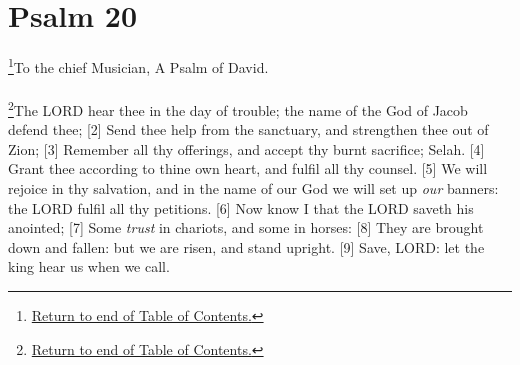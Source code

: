 \chapter{Psalm 20}
\footnote{\textcolor[rgb]{0.00,0.25,0.00}{\hyperlink{TOC}{Return to end of Table of Contents.}}}\textcolor[rgb]{0.00,0.00,1.00}{To the chief Musician, A Psalm of David.}\\
\\
\footnote{\textcolor[cmyk]{0.99998,1,0,0}{\hyperlink{TOC}{Return to end of Table of Contents.}}}\textcolor[cmyk]{0.99998,1,0,0}{The LORD hear thee in the day of trouble; the name of the God of Jacob defend thee;}
[2] \textcolor[cmyk]{0.99998,1,0,0}{Send thee help from the sanctuary, and strengthen thee out of Zion;}
[3] \textcolor[cmyk]{0.99998,1,0,0}{Remember all thy offerings, and accept thy burnt sacrifice; Selah.}
[4] \textcolor[cmyk]{0.99998,1,0,0}{Grant thee according to thine own heart, and fulfil all thy counsel.}
[5] \textcolor[cmyk]{0.99998,1,0,0}{We will rejoice in thy salvation, and in the name of our God we will set up \emph{our} banners: the LORD fulfil all thy petitions.}
[6] \textcolor[cmyk]{0.99998,1,0,0}{Now know I that the LORD saveth his anointed;}
[7] \textcolor[cmyk]{0.99998,1,0,0}{Some \emph{trust} in chariots, and some in horses:}
[8] \textcolor[cmyk]{0.99998,1,0,0}{They are brought down and fallen: but we are risen, and stand upright.}
[9] \textcolor[cmyk]{0.99998,1,0,0}{Save, LORD: let the king hear us when we call.}

